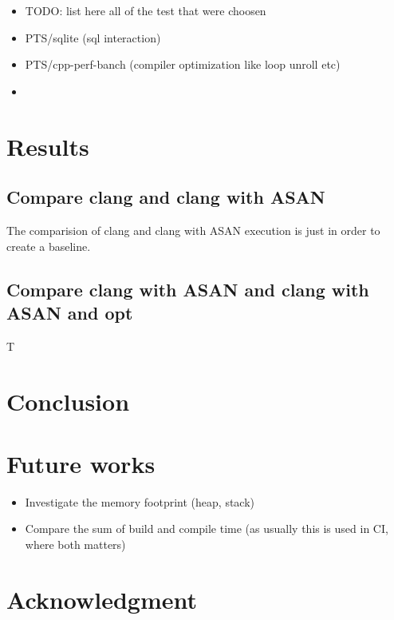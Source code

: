 \documentclass[letterpaper, 10 pt]{llncs}
\begin{document}
\begin{itemize}
	\item TODO: list here all of the test that were choosen
	\item PTS/sqlite (sql interaction)
	\item PTS/cpp-perf-banch (compiler optimization like loop unroll etc)
	\item 
\end{itemize}


\section{Results}

\subsection{Compare clang and clang with ASAN}

The comparision of clang and clang with ASAN execution is just in order to create a baseline.

\subsection{Compare clang with ASAN and clang with ASAN and opt}

T


\section{Conclusion}

\section{Future works}


\begin{itemize}
	\item Investigate the memory footprint (heap, stack)
	\item Compare the sum of build and compile time (as usually this is used in CI, where both matters)
\end{itemize}


\section*{Acknowledgment}


\printbibliography
\end{document}

